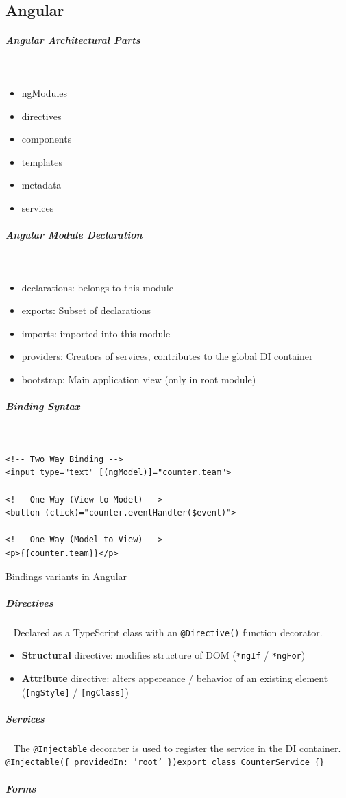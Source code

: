 \documentclass[11pt,twoside,landscape]{article}
\begin{document}
\begin{multicols}{4}
\section{Angular}
\label{sec:orgeab4323}
\subparagraph{Angular Architectural Parts} \
\label{sec:org2aa6074}
\begin{itemize}
\item ngModules
\item directives
\item components
\item templates
\item metadata
\item services
\end{itemize}
\subparagraph{Angular Module Declaration} \
\label{sec:org6be8faa}
\begin{itemize}
\item declarations: belongs to this module
\item exports: Subset of declarations
\item imports: imported into this module
\item providers: Creators of services, contributes to the global DI container
\item bootstrap: Main application view (only in root module)
\end{itemize}
\subparagraph{Binding Syntax} \
\label{sec:org79e425f}
\begin{listing}[htbp]
\begin{verbatim}
<!-- Two Way Binding -->
<input type="text" [(ngModel)]="counter.team">

<!-- One Way (View to Model) -->
<button (click)="counter.eventHandler($event)">

<!-- One Way (Model to View) -->
<p>{{counter.team}}</p>
\end{verbatim}
\caption{\label{lst:bindings-variants-in-angular}Bindings variants in Angular}
\end{listing}
\subparagraph{Directives} \
\label{sec:orgd120125}
Declared as a TypeScript class with an \texttt{@Directive()} function decorator.
\begin{itemize}
\item \textbf{Structural} directive: modifies structure of DOM (\texttt{*ngIf} / \texttt{*ngFor})
\item \textbf{Attribute} directive: alters appereance / behavior of an existing element (\texttt{[ngStyle]} / \texttt{[ngClass]})
\end{itemize}
\subparagraph{Services} \
\label{sec:org484dcd5}
The \texttt{@Injectable} decorater is used to register the service in the DI container.
\texttt{@Injectable(\{ providedIn: 'root' \})export class CounterService \{\}}
\subparagraph{Forms} \
\label{sec:orgaf084a9}


\end{multicols}
\end{document}
